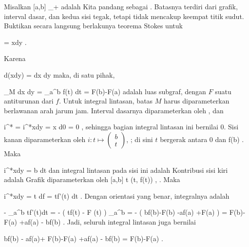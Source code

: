 {

Misalkan
 { [a,b] } { \R_{+}
} {}
adalah
Kita pandang
sebagai
.
Batasnya terdiri dari grafik, interval dasar, dan kedua sisi tegak, tetapi tidak mencakup keempat titik sudut. Buktikan secara langsung berlakunya teorema Stokes untuk

\mavergleichskette
{\vergleichskette
{ \omega
}
{ = }{ xdy
}
{  }{
}
{    }{
}
{   }{
}
}
{}{}{.}

}
{

Karena

\mavergleichskettedisp
{\vergleichskette
{d(xdy)
}
{ =} { dx \wedge dy
}
{ } {
}
{ } {
}
{ } {
}
}
{}{}{}
maka, di satu pihak,

\mavergleichskettedisp
{\vergleichskette
{ \int_M dx \wedge dy
}
{ =} { \int_a^b f(t) dt
}
{ =} { F(b)-F(a)
}
{ } {
}
{ } {
}
}
{}{}{}
adalah luas subgraf, dengan $F$ suatu antiturunan dari $f$. Untuk integral lintasan, batas $M$ harus diparameterkan berlawanan arah jarum jam. Interval dasarnya diparameterkan oleh
, dan

\mavergleichskettedisp
{\vergleichskette
{ i^*\omega
}
{ =} { i^*xdy
}
{ =} { x d0
}
{ =} { 0
}
{ } {
}
}
{}{}{,}
sehingga bagian integral lintasan ini bernilai $0$. Sisi kanan diparameterkan oleh
$i: t \mapsto \begin{pmatrix}  b  \\t   \end{pmatrix}$,
; di sini $t$ bergerak antara
\mathkor {} {0} {dan} {f(b)} {}
. Maka

\mavergleichskettedisp
{\vergleichskette
{ i^*xdy
}
{ =} { b dt
}
{ } {
}
{ } {
}
{ } {
}
}
{}{}{}
dan integral lintasan pada sisi ini adalah
 Kontribusi sisi kiri adalah
 Grafik diparameterkan oleh
 {[a,b]} {
} { t } {(t, f(t))
} {,}
. Maka

\mavergleichskettedisp
{\vergleichskette
{ i^*xdy
}
{ =} { t df
}
{ =} { tf'(t) dt
}
{ } {
}
{ } {
}
}
{}{}{.}
Dengan orientasi yang benar, integralnya adalah

\mavergleichskettealign
{\vergleichskettealign
{ - \int_a^b tf'(t)dt
}
{ =} { - ( tf(t) - F (t) ) \mid _a^b
}
{ =} { - ( bf(b)-F(b) -af(a) +F(a) )
}
{ =} { F(b)-F(a) +af(a) - bf(b)
}
{ } {
}
}
{}
{}{.}
Jadi, seluruh integral lintasan juga bernilai

\mavergleichskettealign
{\vergleichskettealign
{bf(b) - af(a)+ F(b)-F(a) +af(a) - bf(b)
}
{ =} { F(b)-F(a)
}
{ } {
}
{ } {
}
{ } {
}
}
{}
{}{.}

 }



